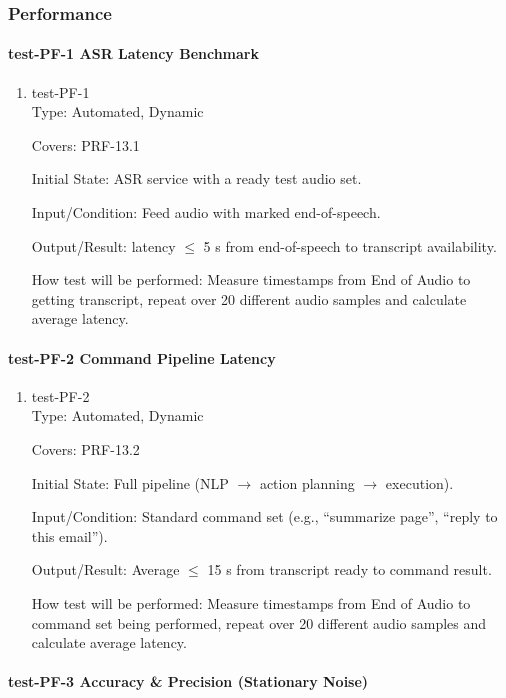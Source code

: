 \documentclass[12pt, titlepage]{article}
\begin{document}
\subsubsection{Performance}

\paragraph{test-PF-1 ASR Latency Benchmark}

\begin{enumerate}
\item{test-PF-1\\}
Type: Automated, Dynamic

Covers: PRF-13.1

Initial State: ASR service with a ready test audio set.

Input/Condition: Feed audio with marked end-of-speech.

Output/Result: latency $\leq$ 5 s from end-of-speech to transcript availability.

How test will be performed: Measure timestamps from End of Audio to getting transcript, repeat over 20 different audio samples and calculate average latency.
\end{enumerate}

\paragraph{test-PF-2 Command Pipeline Latency}

\begin{enumerate}
\item{test-PF-2\\}
Type: Automated, Dynamic

Covers: PRF-13.2

Initial State: Full pipeline (NLP $\rightarrow$ action planning $\rightarrow$ execution).

Input/Condition: Standard command set (e.g., “summarize page”, “reply to this email”).

Output/Result: Average $\leq$ 15 s from transcript ready to command result.

How test will be performed: Measure timestamps from End of Audio to command set being performed, repeat over 20 different audio samples and calculate average latency.
\end{enumerate}

\paragraph{test-PF-3 Accuracy \& Precision (Stationary Noise)}
\end{document}
